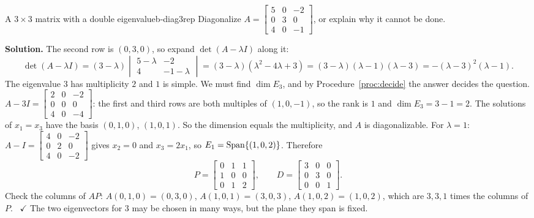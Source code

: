 \documentclass[11pt]{article}
\begin{document}
\begin{exmp}{A $3\times3$ matrix with a double eigenvalue}{b-diag3rep}
Diagonalize $A=\begin{bmatrix}5&0&-2\\0&3&0\\4&0&-1\end{bmatrix}$, or explain why it cannot be done.

\textbf{Solution.} The second row is $(0,3,0)$, so expand $\det(A-\lambda I)$ along it:
\[
\det(A-\lambda I)=(3-\lambda)\begin{vmatrix}5-\lambda&-2\\4&-1-\lambda\end{vmatrix}=(3-\lambda)(\lambda^2-4\lambda+3)=(3-\lambda)(\lambda-1)(\lambda-3)=-(\lambda-3)^2(\lambda-1).
\]
The eigenvalue $3$ has multiplicity $2$ and $1$ is simple. We must find $\dim E_3$, and by Procedure~\ref{proc:decide} the answer decides the question. $A-3I=\begin{bmatrix}2&0&-2\\0&0&0\\4&0&-4\end{bmatrix}$: the first and third rows are both multiples of $(1,0,-1)$, so the rank is $1$ and $\dim E_3=3-1=2$. The solutions of $x_1=x_3$ have the basis $(0,1,0)$, $(1,0,1)$. So the dimension equals the multiplicity, and $A$ is diagonalizable. For $\lambda=1$: $A-I=\begin{bmatrix}4&0&-2\\0&2&0\\4&0&-2\end{bmatrix}$ gives $x_2=0$ and $x_3=2x_1$, so $E_1=\operatorname{Span}\{(1,0,2)\}$. Therefore
\[
P=\begin{bmatrix}0&1&1\\1&0&0\\0&1&2\end{bmatrix},\qquad D=\begin{bmatrix}3&0&0\\0&3&0\\0&0&1\end{bmatrix}.
\]
Check the columns of $AP$: $A(0,1,0)=(0,3,0)$, $A(1,0,1)=(3,0,3)$, $A(1,0,2)=(1,0,2)$, which are $3,3,1$ times the columns of $P$. \ $\checkmark$ The two eigenvectors for $3$ may be chosen in many ways, but the plane they span is fixed.
\end{exmp}
\end{document}
